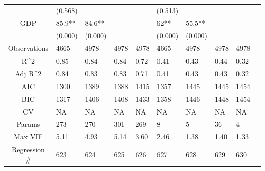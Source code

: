 \documentclass{article}
\begin{document}
\begin{table}[H]
\begin{tabular}{|clllllllll|}
   & (0.568) &  &  &  & (0.513) &  &  &  & \\
  GDP & 85.9** & 84.6** &  &  & 62** & 55.5** &  &  & \\
   & (0.000) & (0.000) &  &  & (0.000) & (0.000) &  &  & \\
  \hline
 Observations & 4665 & 4978 & 4978 & 4978 & 4665 & 4978 & 4978 & 4978 & \\
  R^2 & 0.85 & 0.84 & 0.84 & 0.72 & 0.41 & 0.43 & 0.44 & 0.32 & \\
  Adj R^2 & 0.84 & 0.83 & 0.83 & 0.71 & 0.41 & 0.43 & 0.43 & 0.32 & \\
  AIC & 1300 & 1389 & 1388 & 1415 & 1357 & 1445 & 1445 & 1454 & \\
  BIC & 1317 & 1406 & 1408 & 1433 & 1358 & 1446 & 1448 & 1454 & \\
  CV & NA & NA & NA & NA & NA & NA & NA & NA & \\
  Params & 273 & 270 & 301 & 269 & 8 & 5 & 36 & 4 & \\
  Max VIF & 5.11 & 4.93 & 5.14 & 3.60 & 2.46 & 1.38 & 1.40 & 1.33 & \\
  Regression \# & 623 & 624 & 625 & 626 & 627 & 628 & 629 & 630 & \\
   \hline
\end{tabular}

\end{table}
\end{document}
